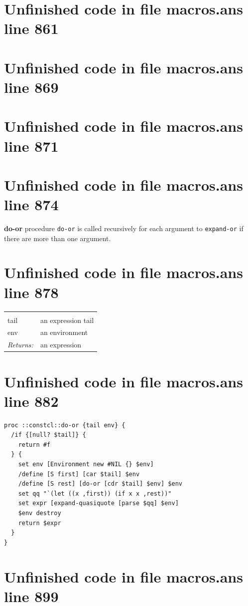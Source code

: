 \documentclass[twoside,9pt]{report}
\begin{document}
\section{Unfinished code in file macros.ans line 861}
\section{Unfinished code in file macros.ans line 869}
\section{Unfinished code in file macros.ans line 871}

\section{Unfinished code in file macros.ans line 874}

\textbf{do-or} procedure \texttt{do-or} is called recursively for each argument to \texttt{expand-or} if there are more than one argument.

\section{Unfinished code in file macros.ans line 878}
\noindent\begin{tabular}{ |p{1.9cm} p{8cm}| }
\hline
\rowcolor[HTML]{CCCCCC} \multicolumn{2}{|l|}{\bf do-or (internal)} \\
tail & an expression tail \\
env & an environment \\
\textit{Returns:} & an expression \\
\hline
\end{tabular}
\section{Unfinished code in file macros.ans line 882}
\begin{lstlisting}
proc ::constcl::do-or {tail env} {
  /if {[null? $tail]} {
    return #f
  } {
    set env [Environment new #NIL {} $env]
    /define [S first] [car $tail] $env
    /define [S rest] [do-or [cdr $tail] $env] $env
    set qq "`(let ((x ,first)) (if x x ,rest))"
    set expr [expand-quasiquote [parse $qq] $env]
    $env destroy
    return $expr
  }
}
\end{lstlisting}
\section{Unfinished code in file macros.ans line 899}
\end{document}
